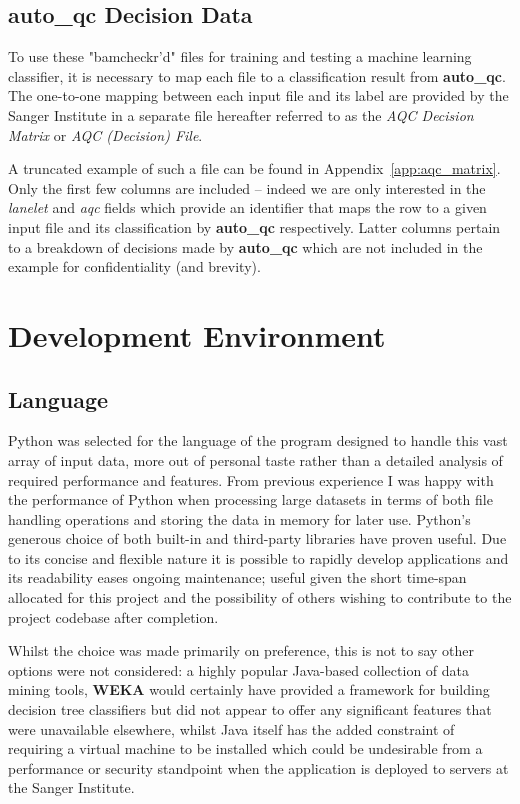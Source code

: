 \subsection{auto\_qc Decision Data}

To use these "bamcheckr'd" files for training and testing a machine learning
classifier, it is necessary to map each file to a classification result from
\textbf{auto\_qc}. The one-to-one mapping between each input file and its label
are provided by the Sanger Institute in a separate file hereafter referred to as
the \textit{AQC Decision Matrix} or \textit{AQC (Decision) File}.

A truncated example of such a file can be found in
Appendix~\ref{app:aqc_matrix}.  Only the first few columns are included --
indeed we are only interested in the \textit{lanelet} and \textit{aqc} fields
which provide an identifier that maps the row to a given input file and its
classification by \textbf{auto\_qc} respectively.  Latter columns pertain to a
breakdown of decisions made by \textbf{auto\_qc} which are not included in the
example for confidentiality (and brevity).


\section{Development Environment}
\label{part1:dev}

\subsection{Language}
\label{part1:dev:lang}

Python was selected for the language of the program designed to handle this vast
array of input data, more out of personal taste rather than a detailed analysis
of required performance and features. From previous experience I was happy with
the performance of Python when processing large datasets in terms of both
file handling operations and storing the data in memory for later use. Python's
generous choice of both built-in and third-party libraries have proven useful.
Due to its concise and flexible nature it is possible to rapidly
develop applications and its readability eases ongoing maintenance; useful given
the short time-span allocated for this project and the possibility of others
wishing to contribute to the project codebase after completion.

Whilst the choice was made primarily on preference, this is not to say other
options were not considered: a highly popular Java-based collection of data
mining tools, \textbf{WEKA}\citep{weka} would certainly have provided a
framework for building decision tree classifiers but did not
appear to offer any significant features that were unavailable elsewhere, whilst
Java itself has the added constraint of requiring a virtual machine to be
installed which could be undesirable from a performance or security
standpoint when the application is deployed to servers at the Sanger Institute.

